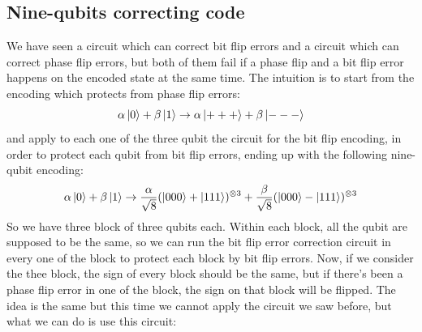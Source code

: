 \documentclass{article}
\begin{document}
	\subsection{Nine-qubits correcting code}
	We have seen a circuit which can correct bit flip errors and a circuit which can correct phase flip errors, but both of them fail if a phase flip and a bit flip error happens on the encoded state at the same time. The intuition is to start from the encoding which protects from phase flip errors:
	\[ \alpha\ket{0} + \beta\ket{1} \rightarrow \alpha\ket{+++} + \beta\ket{---}\]
	and apply to each one of the three qubit the circuit for the bit flip encoding, in order to protect each qubit from bit flip errors, ending up with the following nine-qubit encoding:
	\[ \alpha\ket{0} + \beta\ket{1} \rightarrow \frac{\alpha}{\sqrt{8}}(\ket{000} + \ket{111})^{\otimes 3}+ \frac{\beta}{\sqrt{8}} (\ket{000} - \ket{111})^{\otimes 3}\]
	So we have three block of three qubits each. Within each block, all the qubit are supposed to be the same, so we can run the bit flip error correction circuit in every one of the block to protect each block by bit flip errors. Now, if we consider the thee block, the sign of every block should be the same, but if there's been a phase flip error in one of the block, the sign on that block will be flipped. The idea is the same but this time we cannot apply the circuit we saw before, but what we can do is use this circuit:
\end{document}
